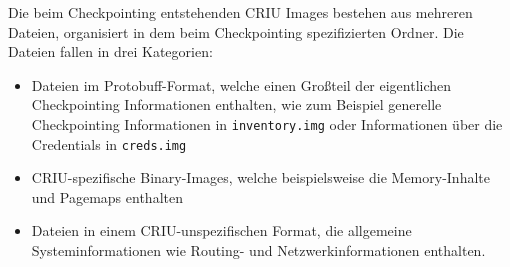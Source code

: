 \documentclass[a4paper]{article}
\begin{document}
Die beim Checkpointing entstehenden CRIU Images bestehen aus mehreren Dateien, organisiert in dem beim Checkpointing spezifizierten Ordner. Die Dateien fallen in drei Kategorien: \begin{itemize}
    \item Dateien im Protobuff-Format, welche einen Großteil der eigentlichen Check\-pointing Informationen enthalten, wie zum Beispiel generelle Checkpointing Informationen in \texttt{inventory.img} oder Informationen über die Credentials in \texttt{creds.img}
    \item CRIU-spezifische Binary-Images, welche beispielsweise die Memory-Inhalte und Pagemaps enthalten
    \item Dateien in einem CRIU-unspezifischen Format, die allgemeine Systeminformationen wie Routing- und Netzwerkinformationen enthalten.
\end{itemize}
\end{document}
